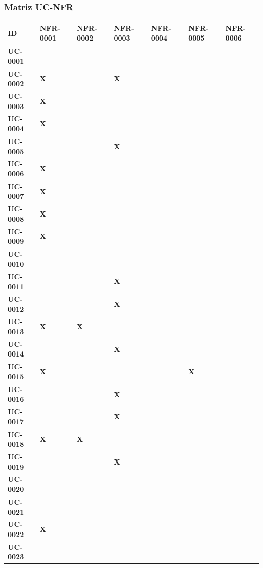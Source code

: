 \subsubsection{Matriz UC-NFR}

\begin{table}[H]
\centering
\small
\begin{tabular}{p{1.5cm}p{0.5cm}p{0.5cm}p{0.5cm}p{0.5cm}p{0.5cm}p{0.5cm}}
\hline
\textbf{ID} & \textbf{NFR-0001} & \textbf{NFR-0002} & \textbf{NFR-0003} & \textbf{NFR-0004} & \textbf{NFR-0005} & \textbf{NFR-0006} \\
\hline
\textbf{UC-0001} &  &  &  &  &  &  \\
\textbf{UC-0002} & \textbf{X} &  & \textbf{X} &  &  &  \\
\textbf{UC-0003} & \textbf{X} &  &  &  &  &  \\
\textbf{UC-0004} & \textbf{X} &  &  &  &  &  \\
\textbf{UC-0005} &  &  & \textbf{X} &  &  &  \\
\textbf{UC-0006} & \textbf{X} &  &  &  &  &  \\
\textbf{UC-0007} & \textbf{X} &  &  &  &  &  \\
\textbf{UC-0008} & \textbf{X} &  &  &  &  &  \\
\textbf{UC-0009} & \textbf{X} &  &  &  &  &  \\
\textbf{UC-0010} &  &  &  &  &  &  \\
\textbf{UC-0011} &  &  & \textbf{X} &  &  &  \\
\textbf{UC-0012} &  &  & \textbf{X} &  &  &  \\
\textbf{UC-0013} & \textbf{X} & \textbf{X} &  &  &  &  \\
\textbf{UC-0014} &  &  & \textbf{X} &  &  &  \\
\textbf{UC-0015} & \textbf{X} &  &  &  & \textbf{X} &  \\
\textbf{UC-0016} &  &  & \textbf{X} &  &  &  \\
\textbf{UC-0017} &  &  & \textbf{X} &  &  &  \\
\textbf{UC-0018} & \textbf{X} & \textbf{X} &  &  &  &  \\
\textbf{UC-0019} &  &  & \textbf{X} &  &  &  \\
\textbf{UC-0020} &  &  &  &  &  &  \\
\textbf{UC-0021} &  &  &  &  &  &  \\
\textbf{UC-0022} & \textbf{X} &  &  &  &  &  \\
\textbf{UC-0023} &  &  &  &  &  &  \\

\end{tabular}
\end{table}
